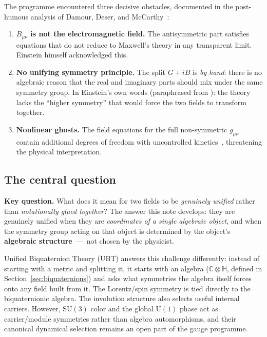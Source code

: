\documentclass[12pt,a4paper]{article}
\theoremstyle{definition}
\theoremstyle{remark}
\begin{document}
The programme encountered three decisive obstacles, documented in the
post-humous analysis of Damour, Deser, and McCarthy~\cite{damour_deser_mccarthy1992}:
\begin{enumerate}
  \item \textbf{$B_{\mu\nu}$ is not the electromagnetic field.}
    The antisymmetric part satisfies equations that do not reduce to Maxwell's
    theory in any transparent limit.  Einstein himself acknowledged this.
  \item \textbf{No unifying symmetry principle.}
    The split $G + iB$ is \emph{by hand}: there is no algebraic reason that
    the real and imaginary parts should mix under the same symmetry group.
    In Einstein's own words (paraphrased from \cite{einstein1945}): the
    theory lacks the ``higher symmetry'' that would force the two fields to
    transform together.
  \item \textbf{Nonlinear ghosts.}
    The field equations for the full non-symmetric $g_{\mu\nu}$ contain
    additional degrees of freedom with uncontrolled kinetics~\cite{moffat_ngt1995},
    threatening the physical interpretation.
\end{enumerate}

\subsection{The central question}

\begin{keybox}
  \textbf{Key question.}  What does it mean for two fields to be
  \emph{genuinely unified} rather than \emph{notationally glued together}?
  The answer this note develops: they are genuinely unified when they are
  \emph{coordinates of a single algebraic object}, and when the symmetry
  group acting on that object is determined by the object's
  \textbf{algebraic structure}~---~not chosen by the physicist.
\end{keybox}

Unified Biquaternion Theory (UBT) answers this challenge differently: instead
of starting with a metric and splitting it, it starts with an algebra
($\mathbb{C}\otimes\mathbb{H}$, defined in Section~\ref{sec:biquaternions}) and
asks what symmetries the algebra itself forces onto any field built from it.
The Lorentz/spin symmetry is tied directly to the biquaternionic algebra.
The involution structure also selects useful internal carriers.  However,
$\mathrm{SU}(3)$ color and the global $\mathrm{U}(1)$ phase act as
carrier/module symmetries rather than algebra automorphisms, and their
canonical dynamical selection remains an open part of the gauge programme.
\end{document}
